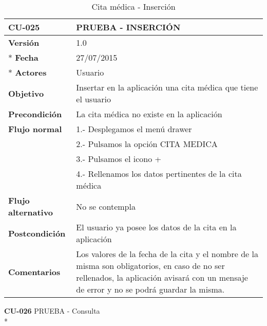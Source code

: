 \documentclass[../pfc.tex]{subfiles}
\begin{document}
		\begin{table}[H]
			\centering
			\begin{tabular}[t]{|p{3cm}|p{9.5cm}|}
				\hline \textbf{CU-025} & \textbf{PRUEBA - INSERCIÓN} \\*
				\hline\hline \textbf{Versión} & 1.0 \\ *
				\hline\hline \textbf{Fecha} & 27/07/2015 \\ *
				\hline\textbf{Actores} 	& Usuario\\*
				\hline \textbf{Objetivo} & Insertar en la aplicación una cita médica que tiene el usuario\\* 			
				\hline \textbf{Precondición} & La cita médica no existe en la aplicación\\* 
				\hline \textbf{Flujo normal} & 1.- Desplegamos el menú drawer \\* 
				& 2.- Pulsamos la opción CITA MEDICA\\*	
				& 3.- Pulsamos el icono +\\*	
				& 4.- Rellenamos los datos pertinentes de la cita médica\\*	
				\hline \textbf{Flujo alternativo} & No se contempla \\* 
				\hline \textbf{Postcondición} & El usuario ya posee los datos de la cita en la aplicación \\* 
				\hline \textbf{Comentarios}   & Los valores de la fecha de la cita y el nombre de la misma son obligatorios, en caso de no ser rellenados, la aplicación avisará con un mensaje de error y no se podrá guardar la misma.\\*
				\hline
			\end{tabular}
			\caption{Cita médica - Inserción}
			\label{tabla:caso025}
		\end{table}
		
		
		
		
		\textbf{CU-026}	PRUEBA - Consulta\\*
		
\end{document}
